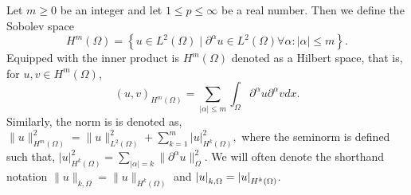   Let $m\ge 0$ be an integer and let $1 \le  p \le  \infty$ be a real number. Then we define the Sobolev space
\[
H^{m}\left( \Omega  \right) = \left\{ u \in L^{2}\left( \Omega  \right)  \mid  \partial ^{\alpha } u \in L^{2}\left( \Omega  \right)  \forall \alpha : \left\lvert \alpha  \right\rvert  \le m \right\}.
\]
Equipped with the inner product is $H^{m}\left( \Omega  \right) $  denoted as a Hilbert space, that is, for $u,v \in H^{m}\left( \Omega  \right) $, \[
    \left( u,v \right) _{H^{m}\left( \Omega   \right) } = \sum_{\left\lvert \alpha  \right\rvert  \le  m}^{}  \int_{\Omega }^{} \partial ^{\alpha } u \partial ^{\alpha } v dx.
\]
Similarly, the norm is is denoted as,
$
\| u \|_{ H^{m}\left( \Omega  \right)  }^{2  }  =  \| u \|_{ L^{2}\left( \Omega  \right)    }^{2} + \sum_{k = 1}^{m}  \left\lvert u \right\rvert ^{2} _{  H^{k}\left( \Omega  \right) },
$
where the seminorm is defined such that, $ \left\lvert u \right\rvert _{H^{k}( \Omega  ) }^{2} =  \sum_{\left\lvert \alpha  \right\rvert  = k}^{} \| \partial ^{\alpha }u \|_{ \Omega  }^{ 2 }  .
$
We will often denote the shorthand notation $ \| u \|_{ k, \Omega  }^{  } = \| u \|_{ H^{k}( \Omega)  }^{  } $ and $ \left\lvert  u  \right\rvert_{ k, \Omega  }^{  }  = \left\lvert  u  \right\rvert_{ H^{k}( \Omega)  }^{  }$.

